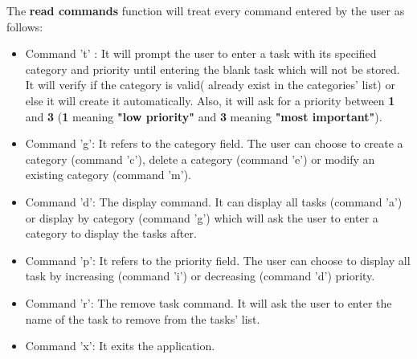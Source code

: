 \documentclass{article}
\begin{document}
    The \textbf{read commands} function will treat every command entered by the user as follows:
        \begin{itemize}
            \item Command 't' : It will prompt the user to enter a task with its specified category and priority until entering the blank task which will not be stored. It will verify if the category is valid( already exist in the categories' list) or else it will create it automatically. Also, it will ask for a priority between \textbf{1} and \textbf{3} (\textbf{1} meaning \textbf{"low priority"} and \textbf{3} meaning \textbf{"most important"}).
            
            \item Command 'g': It refers to the category field. The user can choose to create a category (command 'c'), delete a category (command 'e') or modify an existing category (command 'm').
            
            \item Command 'd': The display command. It can display all tasks (command 'a') or display by category (command 'g') which will ask the user to enter a category to display the tasks after.
            
            \item Command 'p': It refers to the priority field. The user can choose to display all task by increasing (command 'i') or decreasing (command 'd') priority.
            
            \item Command 'r': The remove task command. It will ask the user to enter the name of the task to remove from the tasks' list.
            
            \item Command 'x': It exits the application.
        \end{itemize}
    \vspace{0.5cm}
    
\end{document}
